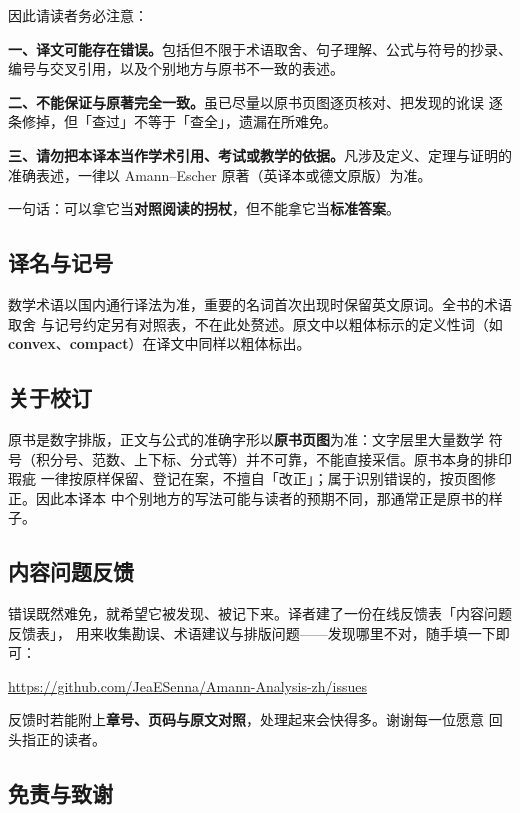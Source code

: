 因此请读者务必注意：

\textbf{一、译文可能存在错误。}包括但不限于术语取舍、句子理解、公式与符号的抄录、
编号与交叉引用，以及个别地方与原书不一致的表述。

\textbf{二、不能保证与原著完全一致。}虽已尽量以原书页图逐页核对、把发现的讹误
逐条修掉，但「查过」不等于「查全」，遗漏在所难免。

\textbf{三、请勿把本译本当作学术引用、考试或教学的依据。}凡涉及定义、定理与证明的
准确表述，一律以 Amann--Escher 原著（英译本或德文原版）为准。

一句话：可以拿它当\textbf{对照阅读的拐杖}，但不能拿它当\textbf{标准答案}。

\subsection*{译名与记号}

数学术语以国内通行译法为准，重要的名词首次出现时保留英文原词。全书的术语取舍
与记号约定另有对照表，不在此处赘述。原文中以粗体标示的定义性词（如
\textbf{convex}、\textbf{compact}）在译文中同样以粗体标出。

\subsection*{关于校订}

原书是数字排版，正文与公式的准确字形以\textbf{原书页图}为准：文字层里大量数学
符号（积分号、范数、上下标、分式等）并不可靠，不能直接采信。原书本身的排印瑕疵
一律按原样保留、登记在案，不擅自「改正」；属于识别错误的，按页图修正。因此本译本
中个别地方的写法可能与读者的预期不同，那通常正是原书的样子。

\subsection*{内容问题反馈}

错误既然难免，就希望它被发现、被记下来。译者建了一份在线反馈表「内容问题反馈表」，
用来收集勘误、术语建议与排版问题——发现哪里不对，随手填一下即可：

\begin{center}
\url{https://github.com/JeaESenna/Amann-Analysis-zh/issues}
\end{center}


反馈时若能附上\textbf{章号、页码与原文对照}，处理起来会快得多。谢谢每一位愿意
回头指正的读者。

\subsection*{免责与致谢}

